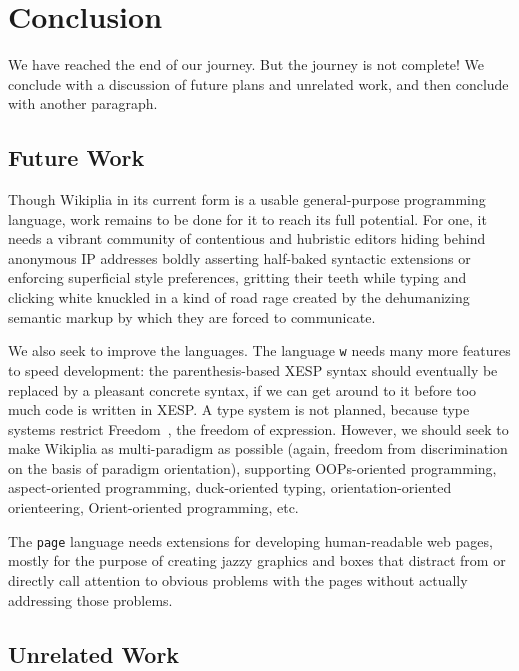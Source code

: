 \documentclass[twocolumn]{article}
\begin{document}
\section{Conclusion} \label{sec:conc}

We have reached the end of our journey. But the journey is not
complete! We conclude with a discussion of future plans and unrelated
work, and then conclude with another paragraph.

\subsection{Future Work}

Though Wikiplia in its current form is a usable general-purpose
programming language, work remains to be done for it to reach its full
potential. For one, it needs a vibrant community of contentious and
hubristic editors hiding behind anonymous IP addresses boldly
asserting half-baked syntactic extensions or enforcing superficial
style preferences, gritting their teeth while typing and clicking
white knuckled in a kind of road rage created by
the dehumanizing semantic markup by which they are forced to
communicate.


We also seek to improve the languages. The language {\tt w} needs many
more features to speed development: the parenthesis-based XESP syntax
should eventually be replaced by a pleasant concrete syntax, if we can
get around to it before too much code is written in XESP. A type
system is not planned, because type systems
restrict Freedom~\fexpression, the freedom of expression. However, we
should seek to make Wikiplia as multi-paradigm as possible (again,
freedom from discrimination on the basis of paradigm
orientation), supporting OOPs-oriented
programming,\z{} aspect-oriented
programming,\z{} duck-oriented
typing,\z{} orientation-oriented
orienteering,\z{} Orient-oriented
programming,\z{} etc.

The {\tt page} language needs extensions for developing human-readable
web pages, mostly for the purpose of creating jazzy graphics and boxes
that distract from or directly call attention to obvious problems with
the pages without actually addressing those problems.

\subsection{Unrelated Work}
\end{document}

